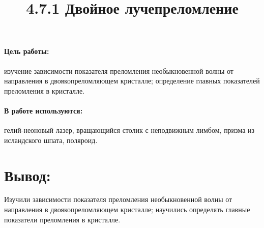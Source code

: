 \documentclass[12pt]{article}
\title{4.7.1 Двойное лучепреломление}
\date{}
\begin{document}
\maketitle

\paragraph{Цель работы:}изучение зависимости показателя преломления необыкновенной волны от направления в двоякопреломляющем кристалле; определение главных показателей преломления в кристалле.

\paragraph{В работе используются:}гелий-неоновый лазер, вращающийся столик с неподвижным лимбом, призма из исландского шпата, поляроид.




%
\section*{Вывод:} Изучили зависимости показателя преломления необыкновенной волны от направления в двоякопреломляющем кристалле; научились определять главные показатели преломления в кристалле.
\end{document}
